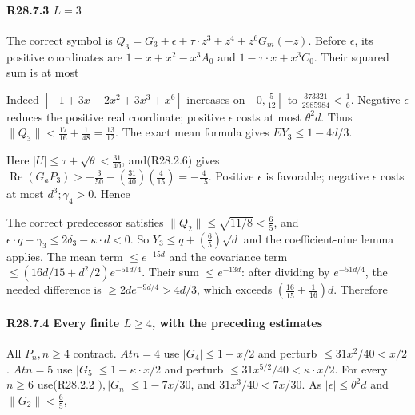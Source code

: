 \paragraph{R28.7.3 \(L=3\)}

The correct symbol is \(Q_{3}=G_{3}+\epsilon+\tau\cdot z^3+z^4+z^6G_m(-z)\). Before \(\epsilon\), its positive coordinates are \(1-x+x^2-x^3A_0\) and \(1-\tau\cdot x+x^3C_0\). Their squared sum is at most


Indeed \([-1+3x-2x^2+3x^3+x^6]\) increases on \([0,\allowbreak \allowbreak \frac{5}{12}]\) to \(\frac{373321}{2985984}<\frac{1}{6}\). Negative \(\epsilon\) reduces the positive real coordinate; positive \(\epsilon\) costs at most \(\theta^2d\). Thus \(\lVert Q_{3}\rVert <\frac{17}{16}+\frac{1}{48}=\frac{13}{12}\). The exact mean formula gives \(EY_{3}\le 1-4d/3\).

Here \(\lvert U\rvert \le \tau+\sqrt{\theta}<\frac{31}{40}\), and(R28.2.6) gives \(\operatorname{Re}(G_a P_{3})>-\frac{3}{50}-(\frac{31}{40})(\frac{4}{15})=-\frac{4}{15}\). Positive \(\epsilon\) is favorable; negative \(\epsilon\) costs at most \(d^3;\gamma_{4}>0\). Hence


The correct predecessor satisfies \(\lVert Q_{2}\rVert \le \sqrt{11/8}<\frac{6}{5}\), and \(\epsilon\cdot q-\gamma_{3}\le 2\delta_3-\kappa\cdot d<0\). So \(Y_{3}\le q+(\frac{6}{5})\sqrt{d}\) and the coefficient-nine lemma applies. The mean term \(\le e^{-15d}\) and the covariance term \(\le (16d/15+d^2/2)e^{-51d/4}\). Their sum \(\le e^{-13d}\): after dividing by \(e^{-51d/4}\), the needed difference is \(\ge 2d e^{-9d/4}>4d/3\), which exceeds \((\frac{16}{15}+\frac{1}{16})d\). Therefore


\paragraph{R28.7.4 Every finite \(L\ge 4\), with the preceding estimates}

All \(P_n,\allowbreak \allowbreak n\ge 4\) contract. \(At n=4\) use \(\lvert G_{4}\rvert \le 1-x/2\) and perturb \(\le 31x^2/40<x/2\). \(At n=5\) use \(\lvert G_{5}\rvert \le 1-\kappa\cdot x/2\) and perturb \(\le 31x^{5/2}/40<\kappa\cdot x/2\). For every \(n\ge 6\) use(R28.2.2 \(),\allowbreak \allowbreak \lvert G_n\rvert \le 1-7x/30\), and \(31x^3/40<7x/30\). As \(\lvert \epsilon\rvert \le \theta^2d\) and \(\lVert G_{2}\rVert <\frac{6}{5}\),

